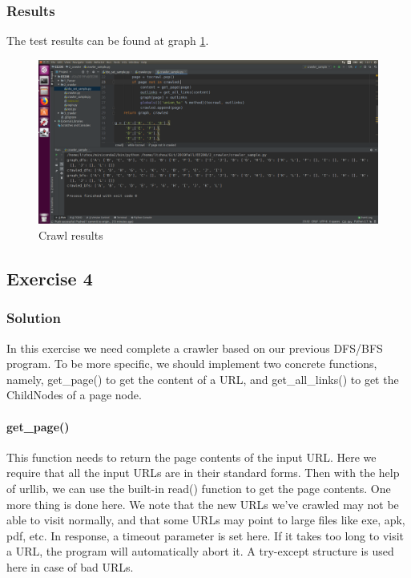 \documentclass{article}
\begin{document}
\subsubsection{Results}

The test results can be found at graph \ref{img:2.1}.

\begin{figure}[htbp]
\centering
\includegraphics[width=13.5cm]{img/test2_1.png}
\caption{Crawl results}
\label{img:2.1}
\end{figure}




\subsection{Exercise 4}

\subsubsection{Solution}

In this exercise we need complete a crawler based on our previous DFS/BFS program. To be more specific, we should implement two concrete functions, namely, get\_page() to get the content of a URL, and get\_all\_links() to get the ChildNodes of a page node.

\paragraph{get\_page()} This function needs to return the page contents of the input URL. Here we require that all the input URLs are in their standard forms. Then with the help of urllib, we can use the built-in read() function to get the page contents. One more thing is done here. We note that the new URLs we've crawled may not be able to visit normally, and that some URLs may point to large files like exe, apk, pdf, etc. In response, a timeout parameter is set here. If it takes too long to visit a URL, the program will automatically abort it. A try-except structure is used here in case of bad URLs.
\end{document}
